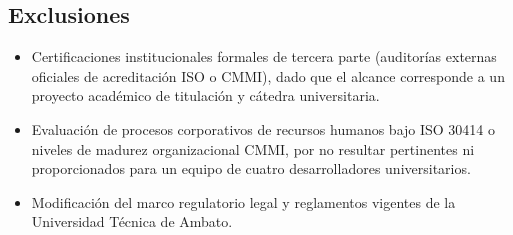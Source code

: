 \documentclass[12pt,a4paper]{article}
\begin{document}
\subsection{Exclusiones}
\begin{itemize}[leftmargin=1.5em, itemsep=2pt]
    \item Certificaciones institucionales formales de tercera parte (auditorías externas oficiales de acreditación ISO o CMMI), dado que el alcance corresponde a un proyecto académico de titulación y cátedra universitaria.
    \item Evaluación de procesos corporativos de recursos humanos bajo ISO 30414 o niveles de madurez organizacional CMMI, por no resultar pertinentes ni proporcionados para un equipo de cuatro desarrolladores universitarios.
    \item Modificación del marco regulatorio legal y reglamentos vigentes de la Universidad Técnica de Ambato.
\end{itemize}

\end{document}
